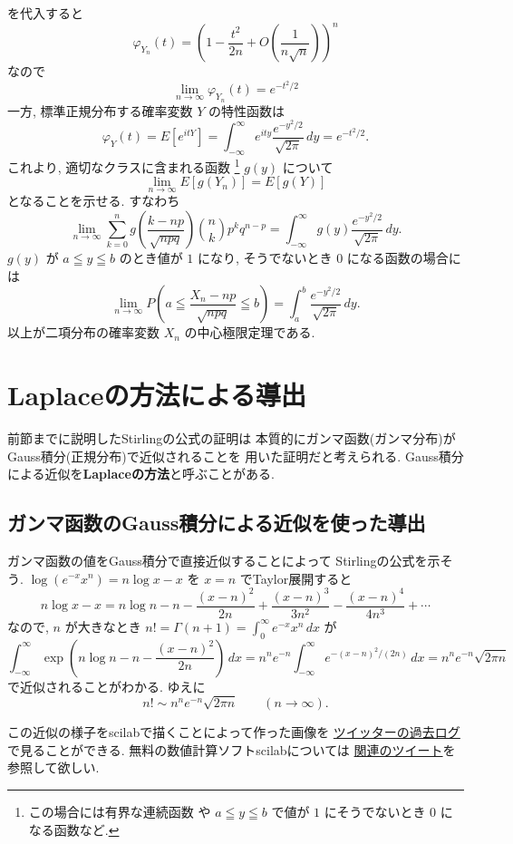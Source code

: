 \documentclass[12pt,twoside]{jarticle}
\theoremstyle{jplain}
\theoremstyle{jplain}
\theoremstyle{jplain}
\numberwithin{theorem}{section}
\numberwithin{equation}{section}
\numberwithin{figure}{section}
\numberwithin{table}{section}
\begin{document}
を代入すると
\[
\varphi_{Y_n}(t)=\left(1-\frac{t^2}{2n}+O\left(\frac{1}{n\sqrt{n}}\right)\right)^n
\]
なので
\[
\lim_{n\to\infty}\varphi_{Y_n}(t) = e^{-t^2/2}
\]
一方, 標準正規分布する確率変数 $Y$ の特性函数は
\[
\varphi_Y(t)
= E[e^{itY}]
= \int_{-\infty}^\infty e^{ity} \frac{e^{-y^2/2}}{\sqrt{2\pi}}\,dy
= e^{-t^2/2}.
\]
これより, 適切なクラスに含まれる函数%
\footnote{この場合には有界な連続函数
や $a\leqq y\leqq b$ で値が $1$ にそうでないとき $0$ になる函数など.} %
$g(y)$ について
\[
\lim_{n\to\infty} E[g(Y_n)] = E[g(Y)]
\]
となることを示せる. すなわち
\[
\lim_{n\to\infty}
\sum_{k=0}^n
g\left(\frac{k-np}{\sqrt{npq}}\right)
\binom{n}{k}p^k q^{n-p}
=
\int_{-\infty}^\infty g(y) \frac{e^{-y^2/2}}{\sqrt{2\pi}}\,dy.
\]
$g(y)$ が $a\leqq y\leqq b$ のとき値が $1$ になり, そうでないとき $0$
になる函数の場合には
\[
\lim_{n\to\infty}
P\left(a\leqq \frac{X_n-np}{\sqrt{npq}}\leqq b\right)
=
\int_a^b \frac{e^{-y^2/2}}{\sqrt{2\pi}}\,dy.
\]
以上が二項分布の確率変数 $X_n$ の中心極限定理である.




\section{Laplaceの方法による導出}
\label{sec:Laplace}

前節までに説明したStirlingの公式の証明は
本質的にガンマ函数(ガンマ分布)がGauss積分(正規分布)で近似されることを
用いた証明だと考えられる.
Gauss積分による近似を{\bfseries Laplaceの方法}と呼ぶことがある.


\subsection{ガンマ函数のGauss積分による近似を使った導出}
\label{sec:Gamma-Gauss-Stirling}

ガンマ函数の値をGauss積分で直接近似することによって
Stirlingの公式を示そう.
$\log(e^{-x}x^n)=n\log x-x$ を $x=n$ でTaylor展開すると
\[
n\log x - x
=n\log n-n
-\frac{(x-n)^2}{2n}
+\frac{(x-n)^3}{3n^2}
-\frac{(x-n)^4}{4n^3}
+\cdots
\]
なので, $n$ が大きなとき $n!=\Gamma(n+1)=\int_0^\infty e^{-x}x^n\,dx$ が
\[
\int_{-\infty}^\infty \exp\left(n\log n-n-\frac{(x-n)^2}{2n}\right)\,dx
=n^n e^{-n} \int_{-\infty}^\infty e^{-(x-n)^2/(2n)}\,dx
=n^n e^{-n} \sqrt{2\pi n}
\]
で近似されることがわかる. ゆえに
\[
n!\sim n^n e^{-n} \sqrt{2\pi n} \qquad (n\to\infty).
\]

この近似の様子をscilabで描くことによって作った画像を
\href{http://twilog.org/genkuroki/date-150709}
{ツイッターの過去ログ}で見ることができる.
無料の数値計算ソフトscilabについては
\href{http://twilog.org/genkuroki/search?word=scilab&ao=a}
{関連のツイート}を参照して欲しい.
\end{document}
